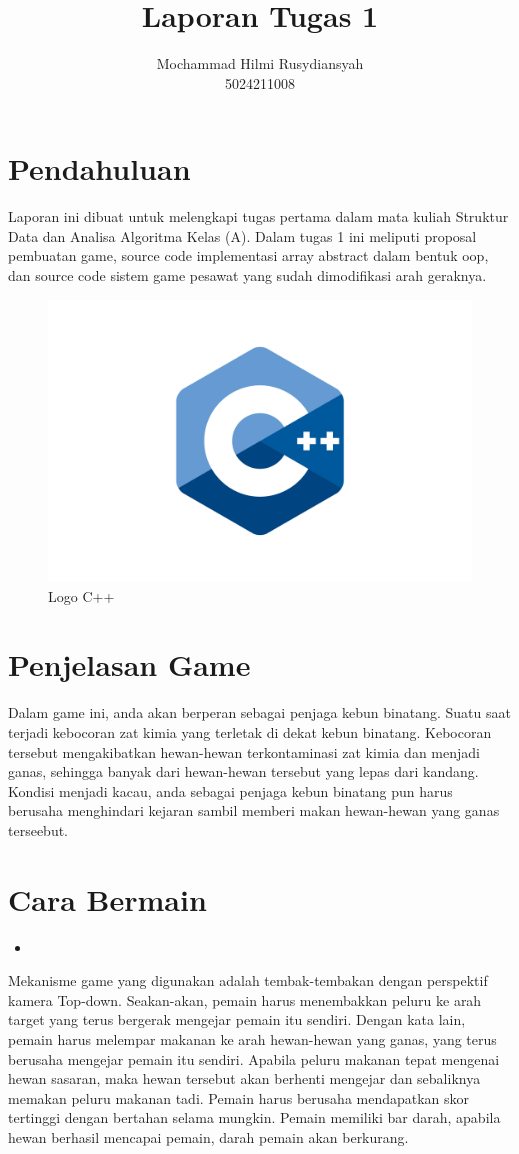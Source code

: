 \documentclass[11pt]{article} %
\title{Laporan Tugas 1}
\author{Mochammad Hilmi Rusydiansyah\\5024211008}
\begin{document}
	\maketitle
		
	\section{Pendahuluan}
	Laporan ini dibuat untuk melengkapi tugas pertama dalam mata kuliah Struktur Data dan Analisa Algoritma Kelas (A). Dalam tugas 1 ini meliputi proposal pembuatan game, source code implementasi array abstract dalam bentuk oop, dan source code sistem game pesawat yang sudah dimodifikasi arah geraknya.
	\begin{figure}[h!]
		\centering
		\includegraphics[width=0.4\linewidth]{C++-Logo}
		\caption{Logo C++}
		\label{fig:C++-Logo}
	\end{figure}
	
	\section{Penjelasan Game}
	Dalam game ini, anda akan berperan sebagai penjaga kebun binatang. Suatu saat terjadi kebocoran zat kimia yang terletak di dekat kebun binatang. Kebocoran tersebut mengakibatkan hewan-hewan terkontaminasi zat kimia dan menjadi ganas, sehingga banyak dari hewan-hewan tersebut yang lepas dari kandang. Kondisi menjadi kacau, anda sebagai penjaga kebun binatang pun harus berusaha menghindari kejaran sambil memberi makan hewan-hewan yang ganas terseebut.
	
	\section{Cara Bermain}
	\begin{itemize}
		\item 
	\end{itemize}
	Mekanisme game yang digunakan adalah tembak-tembakan dengan perspektif kamera Top-down. Seakan-akan, pemain harus menembakkan peluru ke arah target yang terus bergerak mengejar pemain itu sendiri. Dengan kata lain, pemain harus melempar makanan ke arah hewan-hewan yang ganas, yang terus berusaha mengejar pemain itu sendiri. Apabila peluru makanan tepat mengenai hewan sasaran, maka hewan tersebut akan berhenti mengejar dan sebaliknya memakan peluru makanan tadi. Pemain harus berusaha mendapatkan skor tertinggi dengan bertahan selama mungkin.
	Pemain memiliki bar darah, apabila hewan berhasil mencapai pemain, darah pemain akan berkurang.
\end{document}
